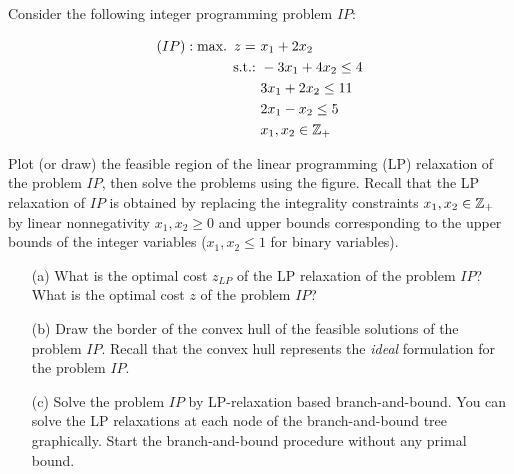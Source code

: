 Consider the following integer programming problem $IP$:


\begin{align*}
	(IP) : \mathop{\text{max.~}} z =~& x_1 + 2x_2   \\
	\mathop{\text{s.t.:~}} & -3x_1 + 4x_2 \le 4 \\
		& 3x_1 + 2x_2 \le 11 \\
		& 2x_1 - x_2 \le 5   \\
		& x_1, x_2 \in \mathbb{Z}_+
\end{align*}

Plot (or draw) the feasible region of the linear programming (LP) relaxation of the problem $IP$, then solve the problems using the figure. Recall that the LP relaxation of $IP$ is obtained by replacing the integrality constraints $x_1,x_2\in \mathbb{Z}_+$ by linear nonnegativity $x_1,x_2\geq 0$ and upper bounds corresponding to the upper bounds of the integer variables ($x_1,x_2\leq 1$ for binary variables). 

\begin{itemize}
	\item[(a)] What is the optimal cost $z_{LP}$ of the LP relaxation of the problem $IP$? What is the optimal cost $z$ of the problem $IP$?
	\item[(b)] Draw the border of the convex hull of the feasible solutions of the problem $IP$. Recall that the convex hull represents the \emph{ideal} formulation for the problem $IP$.
	\item[(c)] Solve the problem $IP$ by LP-relaxation based branch-and-bound. You can solve the LP relaxations at each node of the branch-and-bound tree graphically. Start the branch-and-bound procedure without any primal bound.
\end{itemize}
